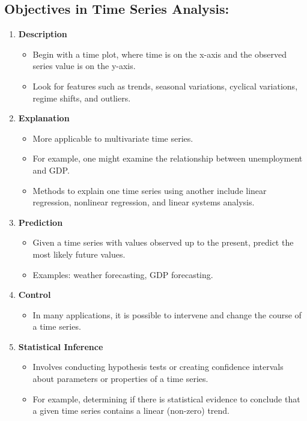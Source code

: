 \subsection{Objectives in Time Series Analysis:}
\begin{enumerate}
    \item \textbf{Description}
    \begin{itemize}
        \item Begin with a time plot, where time is on the x-axis and the observed series value is on the y-axis.
        \item Look for features such as trends, seasonal variations, cyclical variations, regime shifts, and outliers.
    \end{itemize}
    \item \textbf{Explanation}
    \begin{itemize}
        \item More applicable to multivariate time series.
        \item For example, one might examine the relationship between unemployment and GDP.
        \item Methods to explain one time series using another include linear regression, nonlinear regression, and linear systems analysis.
    \end{itemize}
    \item \textbf{Prediction}
    \begin{itemize}
        \item Given a time series with values observed up to the present, predict the most likely future values.
        \item Examples: weather forecasting, GDP forecasting.
    \end{itemize}
    \item \textbf{Control}
    \begin{itemize}
        \item In many applications, it is possible to intervene and change the course of a time series.
    \end{itemize}
    \item \textbf{Statistical Inference}
    \begin{itemize}
        \item Involves conducting hypothesis tests or creating confidence intervals about parameters or properties of a time series.
        \item For example, determining if there is statistical evidence to conclude that a given time series contains a linear (non-zero) trend.
    \end{itemize}
\end{enumerate}
